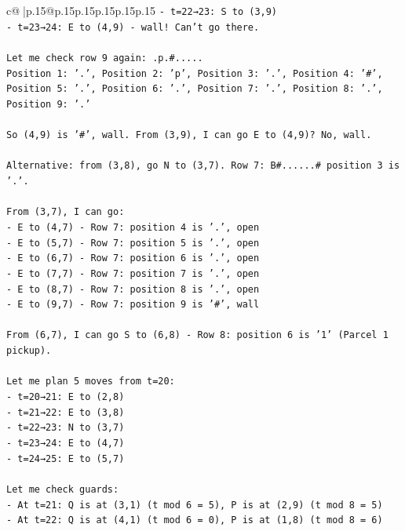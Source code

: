 \documentclass{article}
\begin{document}
{\begin{supertabular}{c@{$\;$}|p{.15\linewidth}@{}p{.15\linewidth}p{.15\linewidth}p{.15\linewidth}p{.15\linewidth}p{.15\linewidth}}
{{{\texttt{{-} t=22→23: S to (3,9)} \\
\texttt{{-} t=23→24: E to (4,9) {-} wall! Can't go there.} \\
\\ 
\texttt{Let me check row 9 again: .p.\#.....} \\
\texttt{Position 1: '.', Position 2: 'p', Position 3: '.', Position 4: '\#', Position 5: '.', Position 6: '.', Position 7: '.', Position 8: '.', Position 9: '.'} \\
\\ 
\texttt{So (4,9) is '\#', wall. From (3,9), I can go E to (4,9)? No, wall.} \\
\\ 
\texttt{Alternative: from (3,8), go N to (3,7). Row 7: B\#......\# position 3 is '.'.} \\
\\ 
\texttt{From (3,7), I can go:} \\
\texttt{{-} E to (4,7) {-} Row 7: position 4 is '.', open} \\
\texttt{{-} E to (5,7) {-} Row 7: position 5 is '.', open} \\
\texttt{{-} E to (6,7) {-} Row 7: position 6 is '.', open} \\
\texttt{{-} E to (7,7) {-} Row 7: position 7 is '.', open} \\
\texttt{{-} E to (8,7) {-} Row 7: position 8 is '.', open} \\
\texttt{{-} E to (9,7) {-} Row 7: position 9 is '\#', wall} \\
\\ 
\texttt{From (6,7), I can go S to (6,8) {-} Row 8: position 6 is '1' (Parcel 1 pickup).} \\
\\ 
\texttt{Let me plan 5 moves from t=20:} \\
\texttt{{-} t=20→21: E to (2,8)} \\
\texttt{{-} t=21→22: E to (3,8)} \\
\texttt{{-} t=22→23: N to (3,7)} \\
\texttt{{-} t=23→24: E to (4,7)} \\
\texttt{{-} t=24→25: E to (5,7)} \\
\\ 
\texttt{Let me check guards:} \\
\texttt{{-} At t=21: Q is at (3,1) (t mod 6 = 5), P is at (2,9) (t mod 8 = 5)} \\
\texttt{{-} At t=22: Q is at (4,1) (t mod 6 = 0), P is at (1,8) (t mod 8 = 6)} \\
}}}
\end{supertabular}}
\end{document}
